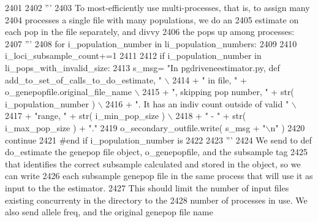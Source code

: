 \begin{DoxyCode}
2401 
2402             \textcolor{stringliteral}{'''}
2403 \textcolor{stringliteral}{            To most-efficiently use multi-processes, that is, to assign many}
2404 \textcolor{stringliteral}{            processes a single file with many populations, we do an}
2405 \textcolor{stringliteral}{            estimate on each pop in the file separately, and divvy}
2406 \textcolor{stringliteral}{            the pops up among processes:}
2407 \textcolor{stringliteral}{            '''}
2408             \textcolor{keywordflow}{for} i\_population\_number \textcolor{keywordflow}{in} li\_population\_numbers:
2409 
2410                 i\_loci\_subsample\_count+=1
2411 
2412                 \textcolor{keywordflow}{if} i\_population\_number \textcolor{keywordflow}{in} li\_pops\_with\_invalid\_size:
2413                     s\_msg= \textcolor{stringliteral}{"In pgdriveneestimator.py, def add\_to\_set\_of\_calls\_to\_do\_estimate, "} \(\backslash\)
2414                                     + \textcolor{stringliteral}{" in file, "} + o\_genepopfile.original\_file\_name \(\backslash\)
2415                                     + \textcolor{stringliteral}{", skipping pop number, "}  + str( i\_population\_number ) \(\backslash\)
2416                                     + \textcolor{stringliteral}{".  It has an indiv count outside of valid "} \(\backslash\)
2417                                     + \textcolor{stringliteral}{"range, "} + str( i\_min\_pop\_size ) \(\backslash\)
2418                                     + \textcolor{stringliteral}{" - "} + str( i\_max\_pop\_size ) + \textcolor{stringliteral}{"."}
2419                     o\_secondary\_outfile.write( s\_msg + \textcolor{stringliteral}{"\(\backslash\)n"} )
2420                     \textcolor{keywordflow}{continue}
2421                 \textcolor{comment}{#end if i\_population\_number is}
2422 
2423                 \textcolor{stringliteral}{'''}
2424 \textcolor{stringliteral}{                We send to def do\_estimate the genepop file object, o\_genepopfile, and the subsample tag}
2425 \textcolor{stringliteral}{                that identifies the correct subsample calculated and stored in the object, so we can write}
2426 \textcolor{stringliteral}{                each subsample genepop file in the same process that will use it as input to the the
       estimator.}
2427 \textcolor{stringliteral}{                This should limit the number of input files existing concurrenty in the directory to the }
2428 \textcolor{stringliteral}{                number of processes in use.  We also send allele freq, and the original genepop file name }

\end{DoxyCode}
